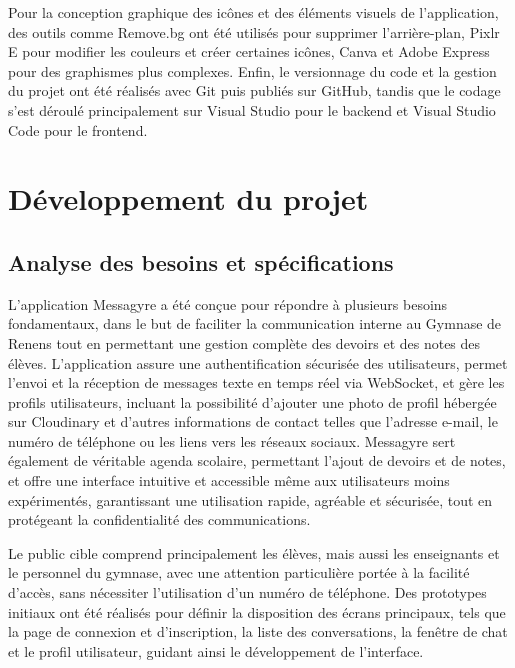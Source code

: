\documentclass[12pt]{report}
\begin{document}
	Pour la conception graphique des icônes et des éléments visuels de l'application, des outils comme Remove.bg\supercite{removebg} ont été utilisés pour supprimer l'arrière-plan, Pixlr E\supercite{pixlre} pour modifier les couleurs et créer certaines icônes, Canva\supercite{canva} et Adobe Express\supercite{adobeexpress} pour des graphismes plus complexes. Enfin, le versionnage du code et la gestion du projet ont été réalisés avec Git\supercite{git} puis publiés sur GitHub\supercite{github}, tandis que le codage s'est déroulé principalement sur Visual Studio\supercite{visualstudio} pour le backend et Visual Studio Code\supercite{vscode} pour le frontend.
	
	
	\chapter{Développement du projet}
	
	\section{Analyse des besoins et spécifications}
	
	L’application Messagyre a été conçue pour répondre à plusieurs besoins fondamentaux, dans le but de faciliter la communication interne au Gymnase de Renens tout en permettant une gestion complète des devoirs et des notes des élèves. L’application assure une authentification sécurisée des utilisateurs, permet l’envoi et la réception de messages texte en temps réel via WebSocket\supercite{websocket}, et gère les profils utilisateurs, incluant la possibilité d’ajouter une photo de profil hébergée sur Cloudinary\supercite{cloudinary} et d’autres informations de contact telles que l’adresse e-mail, le numéro de téléphone ou les liens vers les réseaux sociaux. Messagyre sert également de véritable agenda scolaire, permettant l’ajout de devoirs et de notes, et offre une interface intuitive et accessible même aux utilisateurs moins expérimentés, garantissant une utilisation rapide, agréable et sécurisée, tout en protégeant la confidentialité des communications\supercite{https}.
	
	Le public cible comprend principalement les élèves, mais aussi les enseignants et le personnel du gymnase, avec une attention particulière portée à la facilité d’accès, sans nécessiter l’utilisation d’un numéro de téléphone. Des prototypes initiaux ont été réalisés pour définir la disposition des écrans principaux, tels que la page de connexion et d’inscription, la liste des conversations, la fenêtre de chat et le profil utilisateur, guidant ainsi le développement de l’interface.
	
\end{document}
